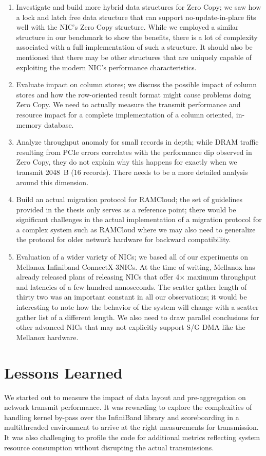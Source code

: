 \begin{enumerate}
\item Investigate and build more hybrid data structures for Zero Copy; we saw how a lock and latch free data structure that can support no-update-in-place 
fits well with the NIC's Zero Copy structure. While we employed a similar structure in our benchmark to show the benefits, there is a lot of complexity associated 
with a full implementation of such a structure. It should also be mentioned that there may be other structures that are uniquely capable of exploiting the modern NIC's 
performance characteristics.
\item Evaluate impact on column stores; we discuss the possible impact of column stores and how the row-oriented result format might cause problems doing Zero Copy. We need 
to actually measure the transmit performance and resource impact for a complete implementation of a column oriented, in-memory database.
\item Analyze throughput anomaly for small records in depth; while DRAM traffic resulting from PCIe errors correlates with the performance dip observed in Zero Copy, 
they do not explain why this happens for exactly when we transmit 2048~B (16 records). There needs to be a more detailed analysis around this dimension.
\item Build an actual migration protocol for RAMCloud; the set of guidelines provided in the thesis only serves as a reference point; there would be significant challenges 
in the actual implementation of a migration protocol for a complex system such as RAMCloud where we may also need to generalize the protocol for older network hardware for backward 
compatibility.
\item Evaluation of a wider variety of NICs; we based all of our experiments on Mellanox Infiniband ConnectX-3\textregistered NICs. At the time of writing, Mellanox has already 
released plans of releasing NICs that offer 4$\times$ maximum throughput and latencies of a few hundred nanoseconds. The scatter gather length of thirty two was an important constant in 
all our observations; it would be interesting to note how the behavior of the system will change with a scatter gather list of a different length. We also need to draw parallel 
conclusions for other advanced NICs that may not explicitly support S/G DMA like the Mellanox hardware.
\end{enumerate}

\section{Lessons Learned}
We started out to measure the impact of data layout and pre-aggregation on network transmit performance. 
It was rewarding to explore the complexities of handling kernel by-pass over the InfiniBand library and 
scoreboarding in a multithreaded environment to arrive at the right measurements for transmission.
It was also challenging to profile the code for additional metrics reflecting system resource consumption 
without disrupting the actual transmissions. 


